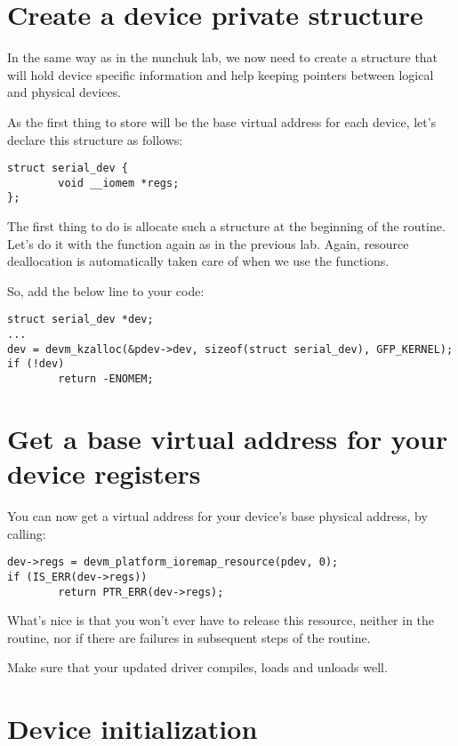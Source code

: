 \section{Create a device private structure}

In the same way as in the nunchuk lab, we now need to create a
structure that will hold device specific information and help
keeping pointers between logical and physical devices.

As the first thing to store will be the base virtual address for
each device, let's declare this structure as follows:

\begin{verbatim}
struct serial_dev {
        void __iomem *regs;
};
\end{verbatim}

The first thing to do is allocate such a structure at the beginning
of the  routine. Let's do it with the 
function again as in the previous lab. Again, resource deallocation is
automatically taken care of when we use the  functions.

So, add the below line to your code:

\begin{verbatim}
struct serial_dev *dev;
...
dev = devm_kzalloc(&pdev->dev, sizeof(struct serial_dev), GFP_KERNEL);
if (!dev)
        return -ENOMEM;
\end{verbatim}

\section{Get a base virtual address for your device registers}

You can now get a virtual address for your device's base physical
address, by calling:

\begin{verbatim}
dev->regs = devm_platform_ioremap_resource(pdev, 0);
if (IS_ERR(dev->regs))
        return PTR_ERR(dev->regs);
\end{verbatim}

What's nice is that you won't ever have to release this resource,
neither in the  routine, nor if there are failures
in subsequent steps of the  routine.

Make sure that your updated driver compiles, loads and unloads well.

\section{Device initialization}

